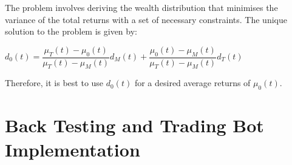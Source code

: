 \documentclass[11pt]{article}
\begin{document}
The problem involves deriving the wealth distribution that minimises the variance of the total returns with a set of necessary constraints. The unique solution to the problem is given by:
\begin{center}
    $d_0(t)= \dfrac{\mu_T(t) - \mu_0(t)}{\mu_T(t) - \mu_M(t)} d_M(t) + \dfrac{\mu_0(t) - \mu_M(t)}{\mu_T(t) - \mu_M(t)} d_T(t)$
\end{center}

Therefore, it is best to use $d_0(t)$ for a desired average returns of $\mu_0(t)$.

\section{Back Testing and Trading Bot Implementation}
\end{document}
